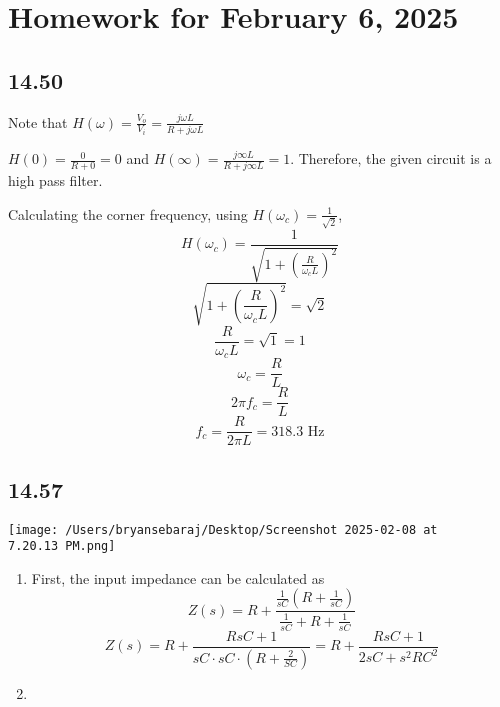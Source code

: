 \documentclass{article}
\begin{document}
\section*{Homework for February 6, 2025}

\subsection*{14.50}

Note that $H(\omega)=\frac{V_o}{V_i}=\frac{j\omega L}{R + j\omega L}$

$H(0)=\frac{0}{R + 0}=0$ and $H(\infty)=\frac{j\infty L}{R + j\infty L}=1$. Therefore, the given circuit is a high pass filter.

Calculating the corner frequency, using $H(\omega_c)=\frac{1}{\sqrt{2}}$,
$$H(\omega_c)=\frac{1}{\sqrt{1+\left(\frac{R}{\omega_cL}\right)^2}}$$
$$\sqrt{1+\left(\frac{R}{\omega_c L}\right)^2} = \sqrt{2}$$
$$\frac{R}{\omega_cL} = \sqrt{1}=1$$
$$\omega_c=\frac{R}{L}$$
$$2\pi f_c=\frac{R}{L}$$
$$f_c=\frac{R}{2\pi L}=318.3 \text{ Hz} $$

\subsection*{14.57}
\texttt{[image: /Users/bryansebaraj/Desktop/Screenshot 2025-02-08 at 7.20.13 PM.png]}

\begin{enumerate}[label=(\alph*)]
    \item First, the input impedance can be calculated as $$Z(s)=R + \frac{\frac{1}{sC}\left(R + \frac{1}{sC} \right)}{\frac{1}{sC} + R + \frac{1}{sC}}$$
        $$Z(s) = R+ \frac{RsC + 1}{sC \cdot sC \cdot \left( R + \frac{2}{SC}\right)}=R+\frac{RsC + 1}{2sC + s^2RC^2}$$


    \item
\end{enumerate}
\end{document}
